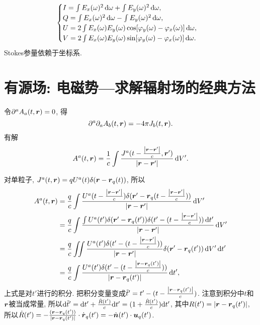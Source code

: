 \begin{equation}
    \begin{cases}
        I=\int E_x(\omega)^2\,\mathrm{d}\omega+\int E_y(\omega)^2\,\mathrm{d}\omega,\\
        Q=\int E_x(\omega)^2\,\mathrm{d}\omega-\int E_y(\omega)^2\,\mathrm{d}\omega,\\
        U=2\int E_x(\omega)E_y(\omega)\cos[\varphi_y(\omega)-\varphi_x(\omega)]\,\mathrm{d}\omega,\\
        V=2\int E_x(\omega)E_y(\omega)\sin[\varphi_y(\omega)-\varphi_x(\omega)]\,\mathrm{d}\omega.
    \end{cases}
\end{equation}
Stokes参量依赖于坐标系.

\section{有源场: 电磁势---求解辐射场的经典方法}

令$\partial^a A_a(t,\boldsymbol{r}) = 0$, 得
\begin{equation}
    \partial^a \partial_a A_b(t,\boldsymbol{r}) = -4\pi J_b(t,\boldsymbol{r}).
\end{equation}
有解
\begin{equation}
    A^a(t,\boldsymbol{r}) = \frac{1}{c} \int 
    \frac{J^a(t-\frac{\left\lvert\boldsymbol{r}-\boldsymbol{r}'\right\rvert}{c},\boldsymbol{r}')}
    {\left\lvert\boldsymbol{r}-\boldsymbol{r}'\right\rvert}\,\mathrm{d} V'.
\end{equation}

对单粒子, $J^a(t,\boldsymbol{r}) = q U^a(t) \delta(\boldsymbol{r}-\boldsymbol{r}_q(t))$, 所以
\begin{align}
    A^a(t,\boldsymbol{r}) &= \frac{q}{c} \int 
    \frac{U^a(t-\frac{\left\lvert\boldsymbol{r}-\boldsymbol{r}'\right\rvert}{c})
    \delta(\boldsymbol{r}'-\boldsymbol{r}_q(t-\frac{\left\lvert\boldsymbol{r}-\boldsymbol{r}'\right\rvert}{c}))}
    {\left\lvert\boldsymbol{r}-\boldsymbol{r}'\right\rvert}\,\mathrm{d} V'\\
    &= \frac{q}{c} \int 
    \frac{ \int
    U^a(t')
    \delta(\boldsymbol{r}'-\boldsymbol{r}_q(t'))
    \delta(t'-(t-\frac{\left\lvert\boldsymbol{r}-\boldsymbol{r}'\right\rvert}{c}))\,\mathrm{d} t'
    }
    {\left\lvert\boldsymbol{r}-\boldsymbol{r}'\right\rvert}\,\mathrm{d} V'\\
    &= \frac{q}{c} \iint 
    \frac{
    U^a(t')
    \delta(t'-(t-\frac{\left\lvert\boldsymbol{r}-\boldsymbol{r}'\right\rvert}{c}))
    }
    {\left\lvert\boldsymbol{r}-\boldsymbol{r}'\right\rvert}
    \delta(\boldsymbol{r}'-\boldsymbol{r}_q(t'))\,\mathrm{d} V'\,\mathrm{d} t'\\
    &= \frac{q}{c} \int 
    \frac{
    U^a(t')
    \delta(t'-(t-\frac{\left\lvert\boldsymbol{r}-\boldsymbol{r}_q(t')\right\rvert}{c}))
    }
    {\left\lvert\boldsymbol{r}-\boldsymbol{r}_q(t')\right\rvert}\,\mathrm{d} t',
\end{align}
上式是对$t'$进行的积分. 把积分变量变成$\tilde{t}'=t'-(t-\frac{\left\lvert\boldsymbol{r}-\boldsymbol{r}_q(t')\right\rvert}{c})$.
注意到积分中$t$和$\boldsymbol{r}$被当成常量, 所以$\mathrm{d}\tilde{t}'=\mathrm{d} t'+\frac{\dot{R}(t')}{c}\mathrm{d} t'=(1+\frac{\dot{R}(t')}{c})\mathrm{d} t'$,
其中$R(t')=\left\lvert\boldsymbol{r}-\boldsymbol{r}_q(t')\right\rvert$, 所以$\dot{R}(t')=-\frac{(\boldsymbol{r}-\boldsymbol{r}_q(t'))}{\left\lvert\boldsymbol{r}-\boldsymbol{r}_q(t')\right\rvert}\cdot\dot{\boldsymbol{r}}_q(t')=-\hat{\boldsymbol{n}}(t')\cdot\boldsymbol{u}_q(t')$.

